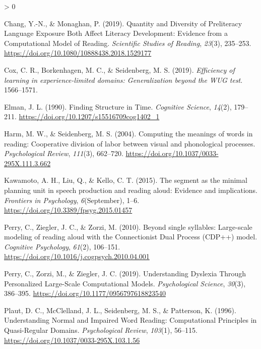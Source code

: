 \documentclass[
  american,
  man,floatsintext]{apa6}
\newlength{\cslhangindent}
\newenvironment{CSLReferences}[2] %
 {%
  \setlength{\parindent}{0pt}
  \ifodd #1 \everypar{\setlength{\hangindent}{\cslhangindent}}\ignorespaces\fi
  \ifnum #2 > 0
  \setlength{\parskip}{#2\baselineskip}
  \fi
 }%
 {}
\begin{document}
\hypertarget{refs}{}
\begin{CSLReferences}{1}{0}
\leavevmode\hypertarget{ref-Chang2019}{}%
Chang, Y.-N., \& Monaghan, P. (2019). {Quantity and Diversity of Preliteracy Language Exposure Both Affect Literacy Development: Evidence from a Computational Model of Reading}. \emph{Scientific Studies of Reading}, \emph{23}(3), 235--253. \url{https://doi.org/10.1080/10888438.2018.1529177}

\leavevmode\hypertarget{ref-Cox2019}{}%
Cox, C. R., Borkenhagen, M. C., \& Seidenberg, M. S. (2019). \emph{{Efficiency of learning in experience-limited domains: Generalization beyond the WUG test}}. 1566--1571.

\leavevmode\hypertarget{ref-Elman1990}{}%
Elman, J. L. (1990). {Finding Structure in Time}. \emph{Cognitive Science}, \emph{14}(2), 179--211. \url{https://doi.org/10.1207/s15516709cog1402_1}

\leavevmode\hypertarget{ref-Harm2004}{}%
Harm, M. W., \& Seidenberg, M. S. (2004). {Computing the meanings of words in reading: Cooperative division of labor between visual and phonological processes}. \emph{Psychological Review}, \emph{111}(3), 662--720. \url{https://doi.org/10.1037/0033-295X.111.3.662}

\leavevmode\hypertarget{ref-Kawamoto2015}{}%
Kawamoto, A. H., Liu, Q., \& Kello, C. T. (2015). {The segment as the minimal planning unit in speech production and reading aloud: Evidence and implications}. \emph{Frontiers in Psychology}, \emph{6}(September), 1--6. \url{https://doi.org/10.3389/fpsyg.2015.01457}

\leavevmode\hypertarget{ref-Perry2010}{}%
Perry, C., Ziegler, J. C., \& Zorzi, M. (2010). {Beyond single syllables: Large-scale modeling of reading aloud with the Connectionist Dual Process (CDP++) model}. \emph{Cognitive Psychology}, \emph{61}(2), 106--151. \url{https://doi.org/10.1016/j.cogpsych.2010.04.001}

\leavevmode\hypertarget{ref-Perry2019}{}%
Perry, C., Zorzi, M., \& Ziegler, J. C. (2019). {Understanding Dyslexia Through Personalized Large-Scale Computational Models}. \emph{Psychological Science}, \emph{30}(3), 386--395. \url{https://doi.org/10.1177/0956797618823540}

\leavevmode\hypertarget{ref-Plaut1996}{}%
Plaut, D. C., McClelland, J. L., Seidenberg, M. S., \& Patterson, K. (1996). {Understanding Normal and Impaired Word Reading: Computational Principles in Quasi-Regular Domains}. \emph{Psychological Review}, \emph{103}(1), 56--115. \url{https://doi.org/10.1037/0033-295X.103.1.56}


\end{CSLReferences}
\end{document}
